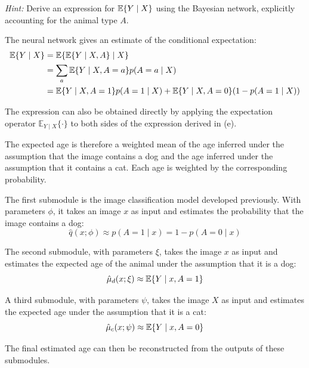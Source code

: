 \documentclass[11pt, a4paper]{exam}
\begin{document}
\begin{exercises}
\begin{parts}
    \textit{Hint:} Derive an expression for $\mathbb{E}\{Y\mid X\}$ using the Bayesian network, explicitly accounting for the animal type $A$.

    \begin{solution}
        The neural network gives an estimate of the conditional expectation:
        \begin{align*}
            \mathbb{E}\{Y \mid X \} &= \mathbb{E} \{ \mathbb{E} \{Y \mid X, A \} \mid X \} \\
            &=\sum_a \mathbb{E} \{Y \mid X, A=a \} p(A=a \mid X) \\
            &=\mathbb{E} \{Y \mid X, A=1 \} p(A=1 \mid X) + \mathbb{E} \{Y \mid X, A=0 \} (1-p(A=1 \mid X))
        \end{align*}

        The expression can also be obtained directly by applying the expectation operator $\mathbb{E}_{Y\mid X}\{\cdot\}$ to both sides of the expression derived in (e).

        The expected age is therefore a weighted mean of the age inferred under the assumption that the image contains a dog and the age inferred under the assumption that it contains a cat. Each age is weighted by the corresponding probability.

        The first submodule is the image classification model developed previously. With parameters $\phi$, it takes an image $x$ as input and estimates the probability that the image contains a dog:
        \[
            \hat q (x;\phi) \approx p(A=1 \mid x) = 1 - p(A=0 \mid x)
        \]

        The second submodule, with parameters $\xi$, takes the image $x$ as input and estimates the expected age of the animal under the assumption that it is a dog:
        \[
            \hat \mu_d (x ; \xi) \approx \mathbb{E}\{Y\mid x,A=1\}
        \]

        A third submodule, with parameters $\psi$, takes the image $X$ as input and estimates the expected age under the assumption that it is a cat:
        \[
            \hat \mu_c (x ; \psi) \approx \mathbb{E}\{Y\mid x,A=0\}
        \]

        The final estimated age can then be reconstructed from the outputs of these submodules.
    \end{solution}
\end{parts}


\begin{parts}

\end{parts}
\end{exercises}
\end{document}
